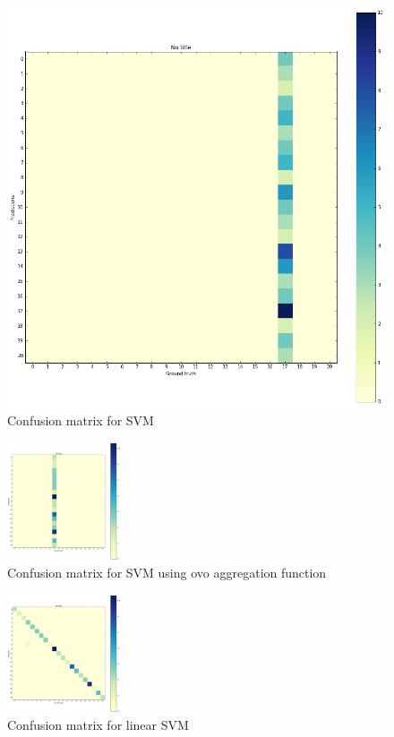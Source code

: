 \begin{multicols}{3}
	\begin{figure}[H]
		\centering
		\includegraphics[height=0.3\textwidth]{classifier_svm}
		\caption{Confusion matrix for SVM}
		\label{svm}
	\end{figure}

	\begin{figure}[H]
		\centering
		\includegraphics[width=0.3\textwidth]{classifier_svm_ovo}
		\caption{Confusion matrix for SVM using ovo aggregation function}
		\label{svm_ovo}
	\end{figure}
	
	\begin{figure}[H]
		\centering
		\includegraphics[width=0.3\textwidth]{classifier_svm_linear}
		\caption{Confusion matrix for linear SVM}
		\label{svm_linear}
	\end{figure}
\end{multicols}

